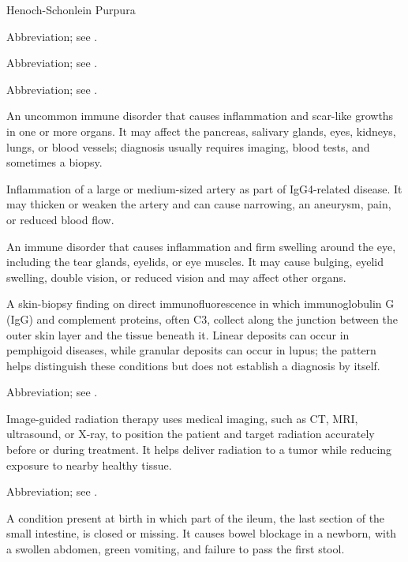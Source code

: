 
\synonyms
Henoch-Schonlein Purpura

 Abbreviation; see .

 Abbreviation; see .

 Abbreviation; see .

 An uncommon immune disorder that causes inflammation and scar-like growths in one or more organs. It may affect the pancreas, salivary glands, eyes, kidneys, lungs, or blood vessels; diagnosis usually requires imaging, blood tests, and sometimes a biopsy.

 Inflammation of a large or medium-sized artery as part of IgG4-related disease. It may thicken or weaken the artery and can cause narrowing, an aneurysm, pain, or reduced blood flow.

 An immune disorder that causes inflammation and firm swelling around the eye, including the tear glands, eyelids, or eye muscles. It may cause bulging, eyelid swelling, double vision, or reduced vision and may affect other organs.

 A skin-biopsy finding on direct immunofluorescence in which immunoglobulin G (IgG) and complement proteins, often C3, collect along the junction between the outer skin layer and the tissue beneath it. Linear deposits can occur in pemphigoid diseases, while granular deposits can occur in lupus; the pattern helps distinguish these conditions but does not establish a diagnosis by itself.

 Abbreviation; see .

 Image-guided radiation therapy uses medical imaging, such as CT, MRI, ultrasound, or X-ray, to position the patient and target radiation accurately before or during treatment. It helps deliver radiation to a tumor while reducing exposure to nearby healthy tissue.

 Abbreviation; see .

 A condition present at birth in which part of the ileum, the last section of the small intestine, is closed or missing. It causes bowel blockage in a newborn, with a swollen abdomen, green vomiting, and failure to pass the first stool.

